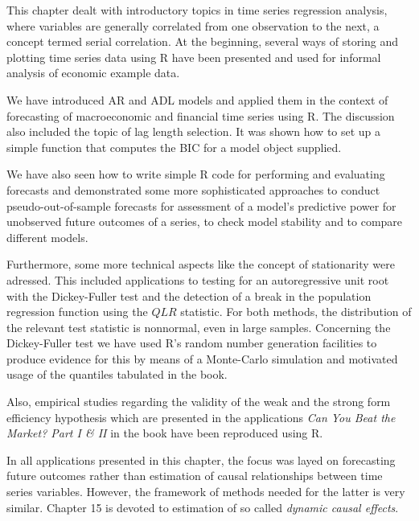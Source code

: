 \documentclass[]{book}
\theoremstyle{definition}
\theoremstyle{definition}
\theoremstyle{definition}
\theoremstyle{remark}
\begin{document}
This chapter dealt with introductory topics in time series regression
analysis, where variables are generally correlated from one observation
to the next, a concept termed serial correlation. At the beginning,
several ways of storing and plotting time series data using R have been
presented and used for informal analysis of economic example data.

We have introduced AR and ADL models and applied them in the context of
forecasting of macroeconomic and financial time series using R. The
discussion also included the topic of lag length selection. It was shown
how to set up a simple function that computes the BIC for a model object
supplied.

We have also seen how to write simple R code for performing and
evaluating forecasts and demonstrated some more sophisticated approaches
to conduct pseudo-out-of-sample forecasts for assessment of a model's
predictive power for unobserved future outcomes of a series, to check
model stability and to compare different models.

Furthermore, some more technical aspects like the concept of
stationarity were adressed. This included applications to testing for an
autoregressive unit root with the Dickey-Fuller test and the detection
of a break in the population regression function using the \(QLR\)
statistic. For both methods, the distribution of the relevant test
statistic is nonnormal, even in large samples. Concerning the
Dickey-Fuller test we have used R's random number generation facilities
to produce evidence for this by means of a Monte-Carlo simulation and
motivated usage of the quantiles tabulated in the book.

Also, empirical studies regarding the validity of the weak and the
strong form efficiency hypothesis which are presented in the
applications \emph{Can You Beat the Market? Part I \& II} in the book
have been reproduced using R.

In all applications presented in this chapter, the focus was layed on
forecasting future outcomes rather than estimation of causal
relationships between time series variables. However, the framework of
methods needed for the latter is very similar. Chapter 15 is devoted to
estimation of so called \emph{dynamic causal effects}.


\end{document}
